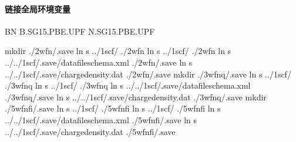 \documentclass[a4paper,12pt,english]{sphinxmanual}
\begin{document}
\paragraph{链接全局环境变量}
\label{\detokenize{tutorials/berkeleygw/gw:id1}}
\begin{sphinxVerbatim}[commandchars=\\\{\}]

BN                          
B.SG15.PBE.UPF              
N.SG15.PBE.UPF              

mkdir ./2\PYGZhy{}wfn/.save
ln \PYGZhy{}s ../1\PYGZhy{}scf/ ./2\PYGZhy{}wfn     
ln \PYGZhy{}s ../1\PYGZhy{}scf/ ./2\PYGZhy{}wfn
ln \PYGZhy{}s ../../1\PYGZhy{}scf/.save/data\PYGZhy{}file\PYGZhy{}schema.xml ./2\PYGZhy{}wfn/.save
ln \PYGZhy{}s ../../1\PYGZhy{}scf/.save/charge\PYGZhy{}density.dat ./2\PYGZhy{}wfn/.save
mkdir ./3\PYGZhy{}wfnq/.save
ln \PYGZhy{}s ../1\PYGZhy{}scf/ ./3\PYGZhy{}wfnq
ln \PYGZhy{}s ../1\PYGZhy{}scf/ ./3\PYGZhy{}wfnq
ln \PYGZhy{}s ../../1\PYGZhy{}scf/.save/data\PYGZhy{}file\PYGZhy{}schema.xml ./3\PYGZhy{}wfnq/.save
ln \PYGZhy{}s ../../1\PYGZhy{}scf/.save/charge\PYGZhy{}density.dat ./3\PYGZhy{}wfnq/.save
mkdir ./5\PYGZhy{}wfn\PYGZus{}fi/.save
ln \PYGZhy{}s ../1\PYGZhy{}scf/ ./5\PYGZhy{}wfn\PYGZus{}fi
ln \PYGZhy{}s ../1\PYGZhy{}scf/ ./5\PYGZhy{}wfn\PYGZus{}fi
ln \PYGZhy{}s ../../1\PYGZhy{}scf/.save/data\PYGZhy{}file\PYGZhy{}schema.xml ./5\PYGZhy{}wfn\PYGZus{}fi/.save
ln \PYGZhy{}s ../../1\PYGZhy{}scf/.save/charge\PYGZhy{}density.dat ./5\PYGZhy{}wfn\PYGZus{}fi/.save


\end{sphinxVerbatim}
\end{document}
